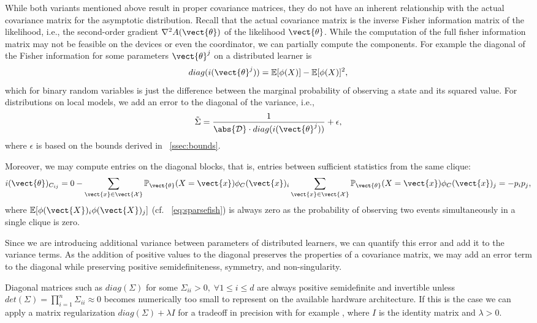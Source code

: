While both variants mentioned above result in proper covariance matrices, they do not have an inherent relationship with the actual covariance matrix for the asymptotic distribution.
Recall that the actual covariance matrix is the inverse Fisher information matrix of the likelihood, i.e., the second-order gradient $\nabla^2 A(\vect{\theta})$ of the likelihood \wrt $\vect{\theta}$.
While the computation of the full fisher information matrix may not be feasible on the devices or even the coordinator, we can partially compute the components. 
For example the diagonal of the Fisher information for some parameters $\vect{\theta}^j$ on a distributed learner is 
\begin{equation}
    diag(i(\vect{\theta}^j)) = \mathbb{E}[\phi(X)] - \mathbb{E}[\phi(X)]^2,
\end{equation}
which for binary random variables is just the difference between the marginal probability of observing a state and its squared value.
For distributions on local models, we add an error to the diagonal of the variance, i.e.,
\begin{equation}
    \tilde{\Sigma}=  \frac{1}{\abs{\mathcal{D}} \cdot diag(i(\vect{\theta}^j))} + \epsilon,
\end{equation}
where $\epsilon$ is based on the bounds derived in \sect~\ref{ssec:bounds}.

Moreover, we may compute entries on the diagonal blocks, that is, entries between sufficient statistics from the same clique:
\begin{equation}
    i(\vect{\theta})_{C_{ij}} = 0- \sum_{\vect{x} \in \vect{\mathcal{X}}} \mathbb{P}_{\vect{\theta}}(X= \vect{x}) \phi_C(\vect{x})_i \sum_{\vect{x} \in \vect{\mathcal{X}}} \mathbb{P}_{\vect{\theta}}(X= \vect{x}) \phi_C(\vect{x})_j= - p_i p_j,
\end{equation}
where $ \mathbb{E}[\phi(\vect{X})_i \phi(\vect{X})_j]$ (cf. \eq~\ref{eq:sparsefish}) is always zero as the probability of observing two events simultaneously in a single clique is zero.

Since we are introducing additional variance between parameters of distributed learners, we can quantify this error and add it to the variance terms.
As the addition of positive values to the diagonal preserves the properties of a covariance matrix, we may add an error term to the diagonal while preserving positive semidefiniteness, symmetry, and non-singularity.

Diagonal matrices such as $diag(\Sigma)$ for some $\Sigma_{ii} > 0, \; \forall 1 \leq i \leq d$ are always positive semidefinite and invertible unless $det(\Sigma) = \prod_{i=1}^n \Sigma_{ii} \approx 0$ becomes numerically too small to represent on the available hardware architecture. 
If this is the case we can apply a matrix regularization $diag(\Sigma) + \lambda I$ for a tradeoff in precision with for example , where $I$ is the identity matrix and $\lambda > 0$.

